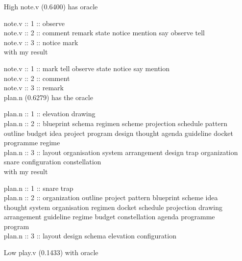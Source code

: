\documentclass[12pt]{article}
\begin{document}
\begin{itemize}
	\item[High] note.v (0.6400) has oracle
	
	note.v :: 1 :: observe\\
	note.v :: 2 :: comment remark state notice mention say observe tell\\
	note.v :: 3 :: notice mark \\
	
	with my result
	
	note.v :: 1 :: mark tell observe state notice say mention\\
	note.v :: 2 :: comment\\
	note.v :: 3 :: remark \\
	
	plan.n (0.6279) has the oracle
	
	plan.n :: 1 :: elevation drawing \\
	plan.n :: 2 :: blueprint schema regimen scheme projection schedule pattern outline budget idea project program design thought agenda guideline docket programme regime \\
	plan.n :: 3 :: layout organisation system arrangement design trap organization snare configuration constellation \\
	
	with my result
	
	plan.n :: 1 :: snare trap \\
	plan.n :: 2 :: organization outline project pattern blueprint scheme idea thought system organisation regimen docket schedule projection drawing arrangement guideline regime budget constellation agenda programme program\\
	plan.n :: 3 :: layout design schema elevation configuration\\ 
	\item[Low] play.v (0.1433) with oracle 
	

\end{itemize}
\end{document}
